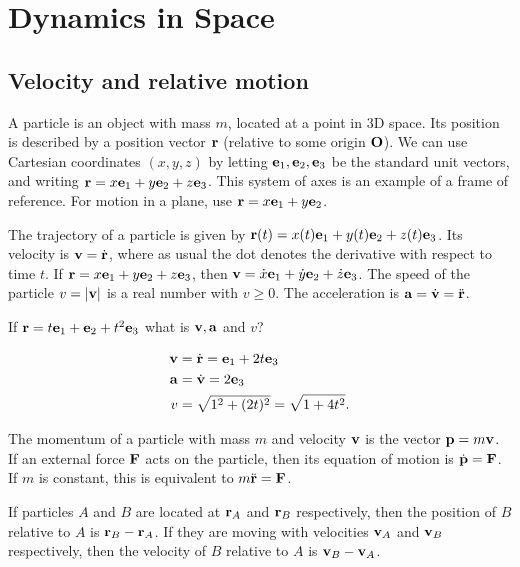 \documentclass[10pt, a4paper]{article}
\begin{document}
\section{Dynamics in Space}

\subsection{Velocity and relative motion}
A particle is an object with mass $m$,
located at a point in $3$D space.
Its position is described by a position vector $\mathbf{r}$
(relative to some origin $\mathbf{O}$).
We can use Cartesian coordinates $(x, y, z)$ by letting $\mathbf{e}_1, \mathbf{e}_2, \mathbf{e}_3$ be the standard unit vectors,
and writing $\mathbf{r} = x\mathbf{e}_1 + y\mathbf{e}_2 + z\mathbf{e}_3$.
This system of axes is an example of a frame of reference.
For motion in a plane,
use $\mathbf{r} = x\mathbf{e}_1 + y\mathbf{e}_2$.

The trajectory of a particle is given by $\mathbf{r}(t) = x(t)\mathbf{e}_1 + y(t)\mathbf{e}_2 + z(t)\mathbf{e}_3$.
Its velocity is $\mathbf{v} = \dot{\mathbf{r}}$,
where as usual the dot denotes the derivative with respect to time $t$.
If $\mathbf{r} = x\mathbf{e}_1 + y\mathbf{e}_2 + z\mathbf{e}_3$,
then $\mathbf{v} = \dot{x}\mathbf{e}_1 + \dot{y}\mathbf{e}_2 + \dot{z}\mathbf{e}_3$.
The speed of the particle $v = |\mathbf{v}|$ is a real number with $v \geq 0$.
The acceleration is $\mathbf{a} = \dot{\mathbf{v}} = \ddot{\mathbf{r}}$.

\begin{example}
    If $\mathbf{r} = t\mathbf{e}_1 + \mathbf{e}_2 + t ^ 2\mathbf{e}_3$ what is $\mathbf{v}, \mathbf{a}$ and $v$?

    \begin{solution}
        \begin{align*}
            \mathbf{v} &= \dot{\mathbf{r}} = \mathbf{e}_1 + 2t\mathbf{e}_3 \\
            \mathbf{a} &= \dot{\mathbf{v}} = 2\mathbf{e}_3 \\
            v &= \sqrt{1 ^ 2 + (2t) ^ 2} = \sqrt{1 + 4t ^ 2}.
        \end{align*}
    \end{solution}
\end{example}

The momentum of a particle with mass $m$ and velocity $\mathbf{v}$ is the vector $\mathbf{p} = m\mathbf{v}$.
If an external force $\mathbf{F}$ acts on the particle,
then its equation of motion is $\dot{\mathbf{p}} = \mathbf{F}$.
If $m$ is constant,
this is equivalent to $m\ddot{\mathbf{r}} = \mathbf{F}$.

If particles $A$ and $B$ are located at $\mathbf{r}_A$ and $\mathbf{r}_B$ respectively,
then the position of $B$ relative to $A$ is $\mathbf{r}_B - \mathbf{r}_A$.
If they are moving with velocities $\mathbf{v}_A$ and $\mathbf{v}_B$ respectively,
then the velocity of $B$ relative to $A$ is $\mathbf{v}_B - \mathbf{v}_A$.
\end{document}
